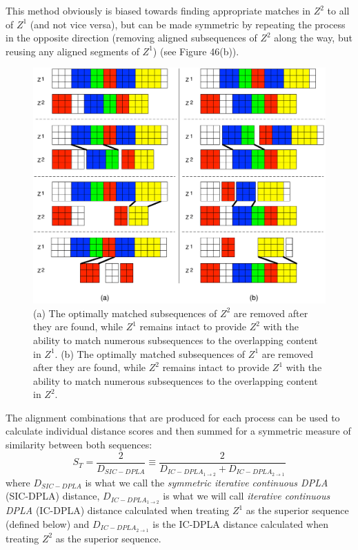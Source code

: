 \documentclass[12pt]{report} 	%
\numberwithin{figure}{chapter}
\numberwithin{table}{chapter}
\numberwithin{equation}{chapter}
\begin{document}
\begin{flushleft}
This method obviously is biased towards finding appropriate matches in $Z^2$ to all of $Z^1$ (and not vice versa), but can be made symmetric by repeating the process in the opposite direction (removing aligned subsequences of $Z^2$ along the way, but reusing any aligned segments of $Z^1$) (see Figure 46(b)). 
\vspace{12pt}
\begin{figure}[h!]
\begin{center}
\includegraphics[width=\linewidth]{GreedyMatching4}
\caption[Asymmetric greedy removal after matching in both directions]{(a) The optimally matched subsequences of $Z^2$ are removed after they are found, while $Z^1$ remains intact to provide $Z^2$ with the ability to match numerous subsequences to the overlapping content in $Z^1$. (b) The optimally matched subsequences of $Z^1$ are removed after they are found, while $Z^2$ remains intact to provide $Z^1$ with the ability to match numerous subsequences to the overlapping content in $Z^2$.}
\end{center}
\vspace{6pt}
\end{figure}
The alignment combinations that are produced for each process can be used to calculate individual distance scores and then summed for a symmetric measure of similarity between both sequences:
\begin{equation}
S_T = \frac{2}{D_{SIC-DPLA}} \equiv \frac{2}{D_{IC-DPLA_{1\to2}} + D_{IC-DPLA_{2\to1}}}
\end{equation}
where $D_{SIC-DPLA}$ is what we call the \textit{symmetric iterative continuous DPLA} (SIC-DPLA) distance, $D_{IC-DPLA_{1\to2}}$ is what we will call \textit{iterative continuous DPLA} (IC-DPLA) distance calculated when treating $Z^1$ as the superior sequence (defined below) and $D_{IC-DPLA_{2\to1}}$ is the IC-DPLA distance calculated when treating $Z^2$ as the superior sequence.


\end{flushleft}
\end{document}
